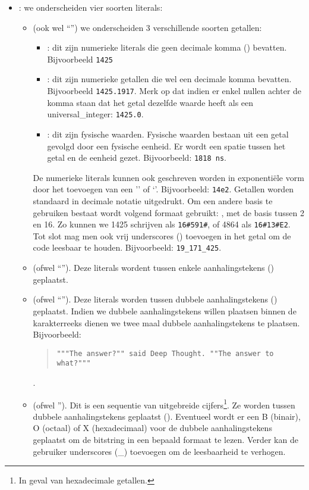 \begin{itemize}
 \item {}: we onderscheiden vier soorten literals:
 \begin{itemize}
  \item {} (ook wel ``'') we onderscheiden 3 verschillende soorten getallen:
  \begin{itemize}
   \item {}: dit zijn numerieke literals die geen decimale komma () bevatten. Bijvoorbeeld \verb+1425+
   \item {}: dit zijn numerieke getallen die wel een decimale komma bevatten. Bijvoorbeeld \verb+1425.1917+. Merk op dat indien er enkel nullen achter de komma staan dat het getal dezelfde waarde heeft als een universal\_integer: \verb+1425.0+.
   \item {}: dit zijn fysische waarden. Fysische waarden bestaan uit een getal gevolgd door een fysische eenheid. Er wordt een spatie tussen het getal en de eenheid gezet. Bijvoorbeeld: \verb+1818 ns+.
  \end{itemize}
De numerieke literals kunnen ook geschreven worden in exponenti\"ele vorm door het toevoegen van een '' of `'. Bijvoorbeeld: \verb+14e2+. Getallen worden standaard in decimale notatie uitgedrukt. Om een andere basis te gebruiken bestaat wordt volgend formaat gebruikt: , met de basis tussen 2 en 16. Zo kunnen we 1425 schrijven als \verb+16#591#+, of 4864 als \verb+16#13#E2+. Tot slot mag men ook vrij underscores (\vhdltermen{\_}) toevoegen in het getal om de code leesbaar te houden. Bijvoorbeeld: \verb+19_171_425+.
  \item {} (ofwel ``''). Deze literals wordent tussen enkele aanhalingstekens () geplaatst.
  \item {} (ofwel ``''). Deze literals worden tussen dubbele aanhalingstekens () geplaatst. Indien we dubbele aanhalingstekens willen plaatsen binnen de karakterreeks dienen we twee maal dubbele aanhalingstekens te plaatsen. Bijvoorbeeld:
\begin{quote}\verb+"""The answer?"" said Deep Thought. ""The answer to what?"""+\cite[\S25]{Adams81BOOK54}\end{quote}.
  \item {} (ofwel ''). Dit is een sequentie van uitgebreide cijfers\footnote{In geval van hexadecimale getallen.}. Ze worden tussen dubbele aanhalingstekens geplaatst (). Eventueel wordt er een B (binair), O (octaal) of X (hexadecimaal) voor de dubbele aanhalingstekens geplaatst om de bitstring in een bepaald formaat te lezen. Verder kan de gebruiker underscores (\_) toevoegen om de leesbaarheid te verhogen.

\end{itemize}
\end{itemize}
